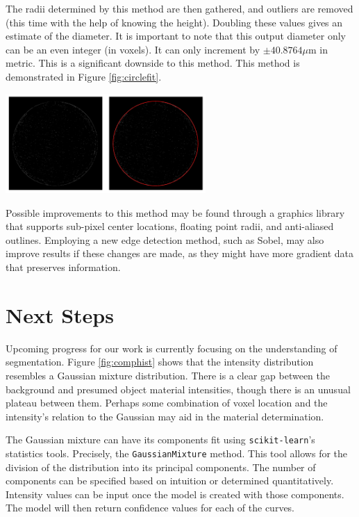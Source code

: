 \documentclass[11pt, letterpaper, notitlepage]{article}
\newenvironment{Figure}
  {\par\medskip\noindent\minipage{\linewidth}}
  {\endminipage\par\medskip}
\begin{document}
\begin{multicols}{2}
The radii determined by this method are then gathered, and outliers are removed (this time with the help of knowing the height). Doubling these values gives an estimate of the diameter. It is important to note that this output diameter only can be an even integer (in voxels). It can only increment by $\pm 40.8764 \mu$m in metric. This is a significant downside to this method. This method is demonstrated in Figure \ref{fig:circlefit}.

\begin{Figure}
  \centering
  \includegraphics[width=3in]{images/circle-fit.png}
  \label{fig:circlefit}
\end{Figure}

Possible improvements to this method may be found through a graphics library that supports sub-pixel center locations, floating point radii, and anti-aliased outlines. Employing a new edge detection method, such as Sobel, may also improve results if these changes are made, as they might have more gradient data that preserves information.

\section{Next Steps}
Upcoming progress for our work is currently focusing on the understanding of segmentation. Figure \ref{fig:comphist} shows that the intensity distribution resembles a Gaussian mixture distribution. There is a clear gap between the background and presumed object material intensities, though there is an unusual plateau between them. Perhaps some combination of voxel location and the intensity's relation to the Gaussian may aid in the material determination. 

The Gaussian mixture can have its components fit using \verb|scikit-learn|'s statistics tools. Precisely, the \verb|GaussianMixture| method. This tool allows for the division of the distribution into its principal components. The number of components can be specified based on intuition or determined quantitatively. Intensity values can be input once the model is created with those components. The model will then return confidence values for each of the curves.


\end{multicols}
\end{document}
